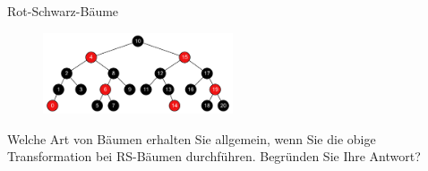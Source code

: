 \documentclass[11pt,a4paper]{article}
\begin{document}
\begin{aufgabe}{2}{Rot-Schwarz-Bäume}
\begin{enumerate}
        \begin{figure}[h!]
            \centering
            \includegraphics[width=0.5\textwidth]{img/2d}
        \end{figure}
        \FloatBarrier
        Welche Art von Bäumen erhalten Sie allgemein, wenn Sie die obige Transformation bei RS-Bäumen durchführen.
        Begründen Sie Ihre Antwort?
    \end{enumerate}
    
\end{aufgabe}
\end{document}

